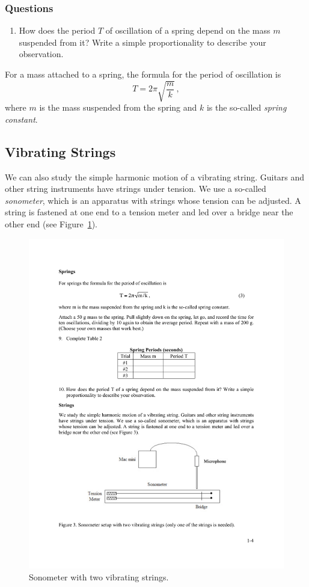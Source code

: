 \documentclass[11pt]{NSF}
\def\be{\begin{equation}}
\def\ee{\end{equation}}
\def\ben{\begin{enumerate}}
\def\een{\end{enumerate}}
\begin{document}
\subsubsection*{Questions}
%
\ben
\item 
How does the period $T$ of oscillation of a spring depend 
on the mass $m$ suspended from it? 
Write a simple proportionality to describe your observation.
\een

For a mass attached to a spring, the formula for the period of 
oscillation is
\be
T=2\pi\sqrt{\frac{m}{k}}\,,
\ee
where $m$ is the mass suspended from the spring and $k$ is the so-called
{\em spring constant}.

\subsection{Vibrating Strings}

We can also study the simple harmonic motion of a vibrating string. 
Guitars and other string instruments have strings under tension. 
We use a so-called {\em sonometer},
which is an apparatus with strings whose tension can be adjusted. 
A string is fastened at one end to a tension meter and led over a 
bridge near the other end (see Figure~\ref{f:3}).
%
\begin{figure}[hbtp]
\begin{center}
\includegraphics[width=.75\textwidth]{fig1_3}
\caption{Sonometer with two vibrating strings.}
\label{f:3}
\end{center}
\end{figure}
%
\end{document}
